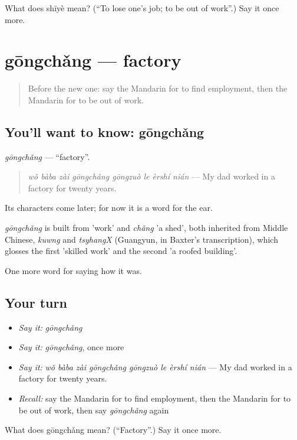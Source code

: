 \begin{tcolorbox}[breakable,colback=teal!4,colframe=teal!35!black,title={Before you move on}]
What does shīyè mean? (\textquotedblleft{}To lose one's job; to be out of work\textquotedblright{}.) Say it once more.
\end{tcolorbox}
\section[gōngchǎng]{gōngchǎng — factory}

\label{lesson:ZH-C487-gongchang}



\begin{quote}
Before the new one: say the Mandarin for to find employment, then the Mandarin for to be out of work.
\end{quote}

\subsection*{You'll want to know: gōngchǎng}
\emph{gōngchǎng} — \textquotedblleft{}factory\textquotedblright{}.

\begin{quote}
\emph{wǒ bàba zài gōngchǎng gōngzuò le èrshí nián} — My dad worked in a factory for twenty years.
\end{quote}

Its characters come later; for now it is a word for the ear.

\begin{cousinweb}
\emph{gōngchǎng} is built from  'work' and \emph{chǎng} 'a shed', both inherited from Middle Chinese, \emph{kuwng} and \emph{tsyhangX} (Guangyun, in Baxter's transcription), which glosses the first 'skilled work' and the second 'a roofed building'.
\end{cousinweb}

\begin{grammarlens}[title={What you've built}]
One more word for saying how it was.
\end{grammarlens}

\subsection*{Your turn}
\begin{itemize}
\raggedright
  \item \emph{Say it:} \emph{gōngchǎng}
  \item \emph{Say it:} \emph{gōngchǎng}, once more
  \item \emph{Say it:} \emph{wǒ bàba zài gōngchǎng gōngzuò le èrshí nián} — My dad worked in a factory for twenty years.
  \item \emph{Recall:} say the Mandarin for to find employment, then the Mandarin for to be out of work, then say \emph{gōngchǎng} again
\end{itemize}

\begin{tcolorbox}[breakable,colback=teal!4,colframe=teal!35!black,title={Before you move on}]
What does gōngchǎng mean? (\textquotedblleft{}Factory\textquotedblright{}.) Say it once more.
\end{tcolorbox}
